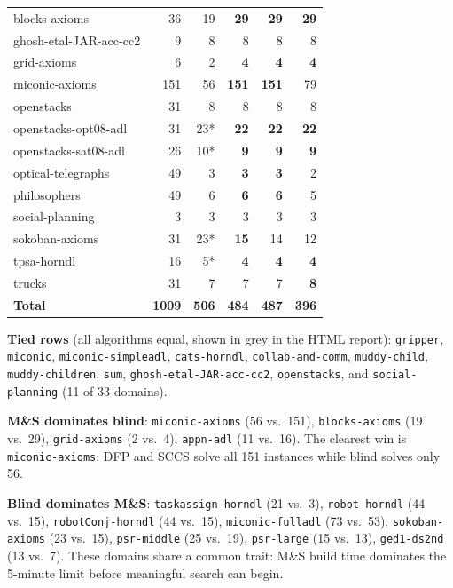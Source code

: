 \documentclass[11pt,a4paper]{article}
\begin{document}
\begin{center}
\begin{longtable}{lrrrrr}
blocks-axioms       &  36 & 19 & \textbf{29} & \textbf{29} & \textbf{29} \\
ghosh-etal-JAR-acc-cc2 &  9 &  8 &  8 &  8 &  8 \\
grid-axioms         &   6 &  2 &  \textbf{4} &  \textbf{4} &  \textbf{4} \\
miconic-axioms      & 151 & 56 & \textbf{151} & \textbf{151} & 79 \\
openstacks          &  31 &  8 &  8 &  8 &  8 \\
openstacks-opt08-adl &  31 & 23* & \textbf{22} & \textbf{22} & \textbf{22} \\
openstacks-sat08-adl &  26 & 10* & \textbf{9} & \textbf{9} & \textbf{9} \\
optical-telegraphs  &  49 &  3 &  \textbf{3} &  \textbf{3} &  2 \\
philosophers        &  49 &  6 &  \textbf{6} &  \textbf{6} &  5 \\
social-planning     &   3 &  3 &  3 &  3 &  3 \\
sokoban-axioms      &  31 & 23* & \textbf{15} & 14 & 12 \\
tpsa-horndl         &  16 & 5* & \textbf{4} & \textbf{4} & \textbf{4} \\
trucks              &  31 &  7 &  7 &  7 &  \textbf{8} \\
\midrule
\textbf{Total}      & \textbf{1009} & \textbf{506} & \textbf{484} & \textbf{487} & \textbf{396} \\
\bottomrule
\end{longtable}
\end{center}

\textbf{Tied rows} (all algorithms equal, shown in grey in the HTML report):
\texttt{gripper}, \texttt{miconic}, \texttt{miconic-simpleadl},
\texttt{cats-horndl}, \texttt{collab-and-comm}, \texttt{muddy-child},
\texttt{muddy-children}, \texttt{sum}, \texttt{ghosh-etal-JAR-acc-cc2},
\texttt{openstacks}, and \texttt{social-planning} (11 of 33 domains).

\textbf{M\&S dominates blind}:
\texttt{miconic-axioms} (56 vs.\ 151), \texttt{blocks-axioms} (19 vs.\ 29),
\texttt{grid-axioms} (2 vs.\ 4), \texttt{appn-adl} (11 vs.\ 16).
The clearest win is \texttt{miconic-axioms}: DFP and SCCS solve all 151
instances while blind solves only 56.

\textbf{Blind dominates M\&S}:
\texttt{taskassign-horndl} (21 vs.\ 3), \texttt{robot-horndl} (44 vs.\ 15),
\texttt{robotConj-horndl} (44 vs.\ 15), \texttt{miconic-fulladl} (73 vs.\ 53),
\texttt{sokoban-axioms} (23 vs.\ 15), \texttt{psr-middle} (25 vs.\ 19),
\texttt{psr-large} (15 vs.\ 13), \texttt{ged1-ds2nd} (13 vs.\ 7).
These domains share a common trait: M\&S build time dominates the 5-minute
limit before meaningful search can begin.
\end{document}
